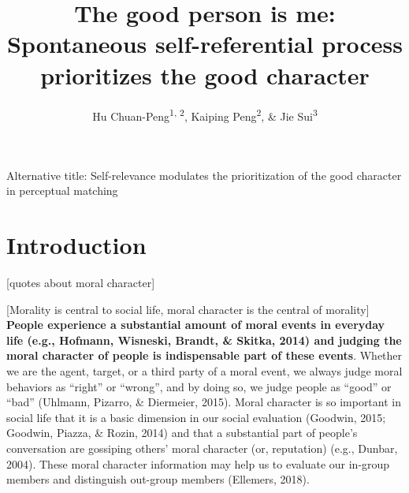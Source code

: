\documentclass[
  man]{apa6}
\title{The good person is me: Spontaneous self-referential process prioritizes the good character}
\author{Hu Chuan-Peng\textsuperscript{1, 2}, Kaiping Peng\textsuperscript{2}, \& Jie Sui\textsuperscript{3}}
\date{}
\affiliation{\vspace{0.5cm}\textsuperscript{1} Nanjing Normal University, 210024 Nanjing, China\\\textsuperscript{2} Tsinghua University, 100084 Beijing, China\\\textsuperscript{3} University of Aberdeen, Aberdeen, Scotland}
\begin{document}
\maketitle

Alternative title: Self-relevance modulates the prioritization of the good character in perceptual matching

\hypertarget{introduction}{%
\section{Introduction}\label{introduction}}

{[}quotes about moral character{]}

{[}Morality is central to social life, moral character is the central of morality{]} \textbf{People experience a substantial amount of moral events in everyday life (e.g., Hofmann, Wisneski, Brandt, \& Skitka, 2014) and judging the moral character of people is indispensable part of these events}. Whether we are the agent, target, or a third party of a moral event, we always judge moral behaviors as ``right'' or ``wrong'', and by doing so, we judge people as ``good'' or ``bad'' (Uhlmann, Pizarro, \& Diermeier, 2015). Moral character is so important in social life that it is a basic dimension in our social evaluation (Goodwin, 2015; Goodwin, Piazza, \& Rozin, 2014) and that a substantial part of people's conversation are gossiping others' moral character (or, reputation) (e.g., Dunbar, 2004). These moral character information may help us to evaluate our in-group members and distinguish out-group members (Ellemers, 2018).
\end{document}
